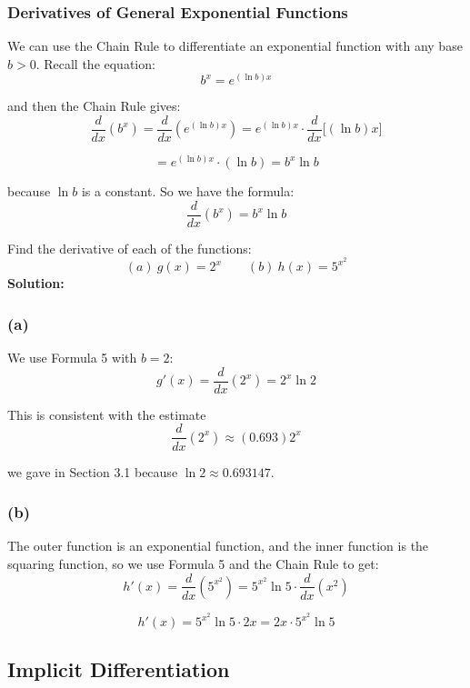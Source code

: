 \documentclass[12pt]{article}
\theoremstyle{beautifulthm}
\begin{document}
\subsubsection{Derivatives of General Exponential Functions}
We can use the Chain Rule to differentiate an exponential function with any base \(b > 0\). Recall the equation:
\[
b^x = e^{(\ln b)x}
\]

and then the Chain Rule gives:
\[
\frac{d}{dx}\left(b^x\right) = \frac{d}{dx} \left(e^{(\ln b)x}\right) = e^{(\ln b)x} \cdot \frac{d}{dx} \big[(\ln b)x\big]
\]

\[
= e^{(\ln b)x} \cdot (\ln b) = b^x \ln b
\]

because \(\ln b\) is a constant. So we have the formula:
\[
\boxed{\frac{d}{dx}\left(b^x\right) = b^x \ln b}
\]


\begin{tcolorbox}[colback=examplebg, colframe=red!75!black, title=\textbf{EXAMPLE 2 : Find the Derivative of the function}, fonttitle=\bfseries, sharp corners]

Find the derivative of each of the functions:
\[
(a) \ g(x) = 2^x \quad \quad (b) \ h(x) = 5^{x^2}
\]
\tcblower
\textbf{Solution:}
\subsubsection*{(a)}

We use Formula 5 with \(b = 2\):
\[
g'(x) = \frac{d}{dx} \left(2^x\right) = 2^x \ln 2
\]

This is consistent with the estimate
\[
\frac{d}{dx} \left(2^x\right) \approx (0.693)2^x
\]

we gave in Section 3.1 because \(\ln 2 \approx 0.693147\).

\subsubsection*{(b)}

The outer function is an exponential function, and the inner function is the squaring function, so we use Formula 5 and the Chain Rule to get:
\[
h'(x) = \frac{d}{dx} \left(5^{x^2}\right) = 5^{x^2} \ln 5 \cdot \frac{d}{dx} \left(x^2\right)
\]

\[
h'(x) = 5^{x^2} \ln 5 \cdot 2x = 2x \cdot 5^{x^2} \ln 5
\]

\end{tcolorbox}

\newpage
\subsection{Implicit Differentiation}
\end{document}
